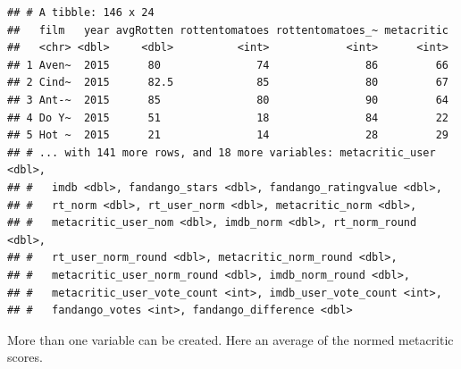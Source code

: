 \documentclass[
]{book}
\newenvironment{Shaded}{\begin{snugshade}}{\end{snugshade}}
\newcommand{\DataTypeTok}[1]{\textcolor[rgb]{0.13,0.29,0.53}{#1}}
\newcommand{\DecValTok}[1]{\textcolor[rgb]{0.00,0.00,0.81}{#1}}
\newcommand{\KeywordTok}[1]{\textcolor[rgb]{0.13,0.29,0.53}{\textbf{#1}}}
\newcommand{\NormalTok}[1]{#1}
\newcommand{\OperatorTok}[1]{\textcolor[rgb]{0.81,0.36,0.00}{\textbf{#1}}}
\newcommand{\StringTok}[1]{\textcolor[rgb]{0.31,0.60,0.02}{#1}}
\theoremstyle{definition}
\theoremstyle{definition}
\theoremstyle{definition}
\theoremstyle{remark}
\begin{document}
\begin{verbatim}
## # A tibble: 146 x 24
##   film   year avgRotten rottentomatoes rottentomatoes_~ metacritic
##   <chr> <dbl>     <dbl>          <int>            <int>      <int>
## 1 Aven~  2015      80               74               86         66
## 2 Cind~  2015      82.5             85               80         67
## 3 Ant-~  2015      85               80               90         64
## 4 Do Y~  2015      51               18               84         22
## 5 Hot ~  2015      21               14               28         29
## # ... with 141 more rows, and 18 more variables: metacritic_user <dbl>,
## #   imdb <dbl>, fandango_stars <dbl>, fandango_ratingvalue <dbl>,
## #   rt_norm <dbl>, rt_user_norm <dbl>, metacritic_norm <dbl>,
## #   metacritic_user_nom <dbl>, imdb_norm <dbl>, rt_norm_round <dbl>,
## #   rt_user_norm_round <dbl>, metacritic_norm_round <dbl>,
## #   metacritic_user_norm_round <dbl>, imdb_norm_round <dbl>,
## #   metacritic_user_vote_count <int>, imdb_user_vote_count <int>,
## #   fandango_votes <int>, fandango_difference <dbl>
\end{verbatim}

More than one variable can be created. Here an average of the normed metacritic scores.

\begin{Shaded}
\end{Shaded}
\end{document}

